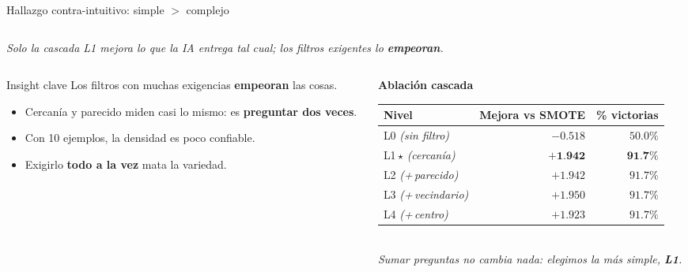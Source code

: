 \begin{frame}{Hallazgo contra-intuitivo: simple $>$ complejo}
\begin{columns}[T]
\end{columns}

\vspace{-0.3em}
{\centering\scriptsize\itshape
Solo la cascada L1 \alert{mejora} lo que la IA entrega tal cual; los filtros exigentes lo \textbf{empeoran}.\par}

\vspace{0.1em}

\begin{columns}[T]

\begin{column}{0.55\textwidth}
\begin{block}{Insight clave}
\scriptsize
Los filtros con muchas exigencias \textbf{empeoran} las cosas.
\vspace{0.1em}
\begin{itemize}\setlength\itemsep{0pt}\scriptsize
  \item Cercanía y parecido miden casi lo mismo: es \textbf{preguntar dos veces}.
  \item Con 10 ejemplos, la densidad es poco confiable.
  \item Exigirlo \textbf{todo a la vez} mata la variedad.
\end{itemize}
\end{block}
\end{column}

\begin{column}{0.45\textwidth}
\centering
{\scriptsize\textbf{Ablación cascada} }\\[3pt]
{\scriptsize
\setlength{\tabcolsep}{6pt}
\renewcommand{\arraystretch}{1.05}
\begin{tabular}{@{}lrr@{}}
\toprule
\textbf{Nivel} & \textbf{Mejora vs SMOTE} & \textbf{\% victorias} \\
\midrule
L0 \textit{\textcolor{uaigray!85}{(sin filtro)}}      & $-0{.}518$ & $50{.}0\%$ \\
\rowcolor{uaigreen!12}
L1\,\alert{$\star$} \textit{\textcolor{uaigray!85}{(cercanía)}}   & \alert{$\boldsymbol{+1{.}942}$} & \alert{$\boldsymbol{91{.}7\%}$} \\
L2 \textit{\textcolor{uaigray!85}{(+\,parecido)}}      & $+1{.}942$ & $91{.}7\%$ \\
L3 \textit{\textcolor{uaigray!85}{(+\,vecindario)}}    & $+1{.}950$ & $91{.}7\%$ \\
L4 \textit{\textcolor{uaigray!85}{(+\,centro)}}        & $+1{.}923$ & $91{.}7\%$ \\
\bottomrule
\end{tabular}}\\[4pt]
{\tiny\itshape Sumar preguntas no cambia nada: elegimos la más simple, \textbf{L1}.}
\end{column}

\end{columns}
\end{frame}
\fi

